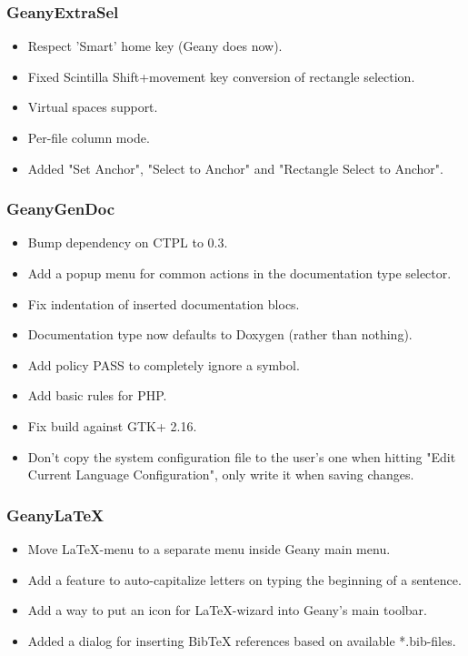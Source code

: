 \documentclass[%
paper=a4,%
fontsize=11pt,%
twoside=false,%
DIV18,
headsepline,
plainheadsepline,
footsepline,
plainfootsepline,
parskip=half,%
openany,%
]{scrartcl}
\begin{document}
\subsubsection{GeanyExtraSel}
\begin{itemize}
	\item Respect 'Smart' home key (Geany does now).
	\item Fixed Scintilla Shift+movement key conversion of rectangle selection.
	\item Virtual spaces support.
	\item Per-file column mode.
	\item Added "Set Anchor", "Select to Anchor" and "Rectangle Select to Anchor".
\end{itemize}

\subsubsection{GeanyGenDoc}
\begin{itemize}
	\item Bump dependency on CTPL to 0.3.
	\item Add a popup menu for common actions in the documentation type selector.
	\item Fix indentation of inserted documentation blocs.
	\item Documentation type now defaults to Doxygen (rather than nothing).
	\item Add policy PASS to completely ignore a symbol.
	\item Add basic rules for PHP.
	\item Fix build against GTK+ 2.16.
	\item Don't copy the system configuration file to the user's one when hitting
      "Edit Current Language Configuration", only write it when saving changes.
\end{itemize}

\subsubsection{GeanyLaTeX}
\begin{itemize}
	\item Move LaTeX-menu to a separate menu inside Geany main menu.
	\item Add a feature to auto-capitalize letters on typing the beginning of a sentence.
	\item Add a way to put an icon for LaTeX-wizard into Geany's main toolbar.
	\item Added a dialog for inserting BibTeX references based on available *.bib-files.
\end{itemize}
\end{document}
